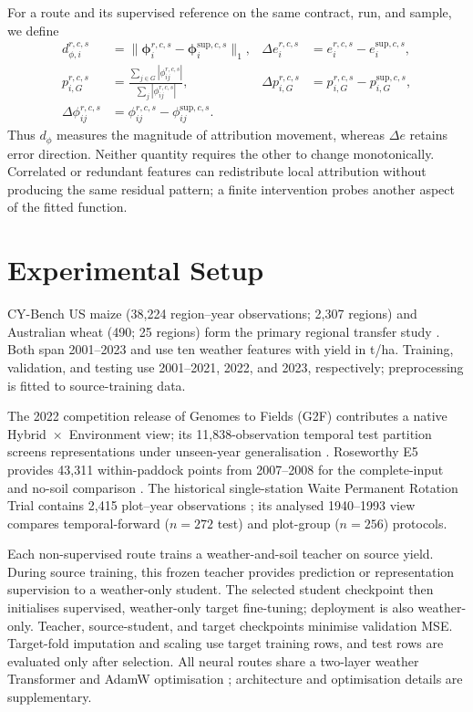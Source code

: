 \documentclass[runningheads]{venue/lncs/llncs}
\begin{document}
For a route and its supervised reference on the same contract, run, and sample, we define
\begin{subequations}
\label{eq:matched-diagnostics}
\begin{align}
d_{\phi,i}^{r,c,s}&=\|\boldsymbol{\phi}_i^{r,c,s}-\boldsymbol{\phi}_i^{\mathrm{sup},c,s}\|_1, &
\Delta e_i^{r,c,s}&=e_i^{r,c,s}-e_i^{\mathrm{sup},c,s},\nonumber\\
p_{i,G}^{r,c,s}&=\frac{\sum_{j\in G}|\phi_{ij}^{r,c,s}|}{\sum_j|\phi_{ij}^{r,c,s}|}, &
\Delta p_{i,G}^{r,c,s}&=p_{i,G}^{r,c,s}-p_{i,G}^{\mathrm{sup},c,s},\\
\Delta\phi_{ij}^{r,c,s}&=\phi_{ij}^{r,c,s}-\phi_{ij}^{\mathrm{sup},c,s}.
\end{align}
\end{subequations}
Thus $d_\phi$ measures the magnitude of attribution movement, whereas $\Delta e$ retains error direction. Neither quantity requires the other to change monotonically. Correlated or redundant features can redistribute local attribution without producing the same residual pattern; a finite intervention probes another aspect of the fitted function.

\section{Experimental Setup}

CY-Bench US maize (38,224 region--year observations; 2,307 regions) and Australian wheat (490; 25 regions) form the primary regional transfer study \cite{Kallenberg2026CYBench}. Both span 2001--2023 and use ten weather features with yield in t/ha. Training, validation, and testing use 2001--2021, 2022, and 2023, respectively; preprocessing is fitted to source-training data.

The 2022 competition release of Genomes to Fields (G2F) contributes a native Hybrid~$\times$~Environment view; its 11,838-observation temporal test partition screens representations under unseen-year generalisation \cite{McFarland2020G2F}. Roseworthy E5 provides 43,311 within-paddock points from 2007--2008 for the complete-input and no-soil comparison \cite{David2022RoseworthyDataset}. The historical single-station Waite Permanent Rotation Trial contains 2,415 plot--year observations \cite{Sanderman2015WaiteDataset}; its analysed 1940--1993 view compares temporal-forward ($n=272$ test) and plot-group ($n=256$) protocols.

Each non-supervised route trains a weather-and-soil teacher on source yield. During source training, this frozen teacher provides prediction or representation supervision to a weather-only student. The selected student checkpoint then initialises supervised, weather-only target fine-tuning; deployment is also weather-only. Teacher, source-student, and target checkpoints minimise validation MSE. Target-fold imputation and scaling use target training rows, and test rows are evaluated only after selection. All neural routes share a two-layer weather Transformer and AdamW optimisation \cite{Loshchilov2019AdamW,Vaswani2017Transformer}; architecture and optimisation details are supplementary.
\end{document}
